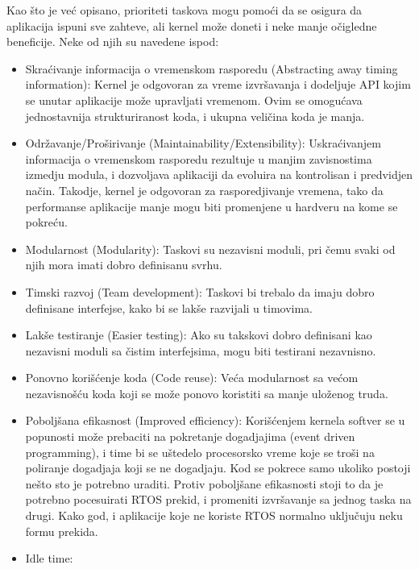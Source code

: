 \documentclass[a4paper,12pt, master]{etf}
\begin{document}
	Kao \v{s}to je ve\'{c} opisano, prioriteti taskova mogu pomo\'{c}i da se
	osigura da aplikacija ispuni sve zahteve, ali kernel mo\v{z}e doneti i neke
	manje o\v{c}igledne beneficije. Neke od njih su	navedene ispod:

	\begin{itemize}
		\item Skra\'{c}ivanje informacija o vremenskom rasporedu (Abstracting
		away timing information):
		Kernel je odgovoran za vreme izvr\v{s}avanja i dodeljuje API kojim se
		unutar aplikacije mo\v{z}e upravljati vremenom. Ovim se omogu\'{c}ava
		jednostavnija strukturiranost koda, i ukupna veli\v{c}ina koda je manja.
		\item Odr\v{z}avanje/Pro\v{s}irivanje (Maintainability/Extensibility):
		Uskra\'{c}ivanjem informacija o vremenskom rasporedu rezultuje u manjim
		zavisnostima izmedju modula, i dozvoljava aplikaciji da evoluira na
		kontrolisan i predvidjen na\v{c}in. Takodje, kernel je odgovoran za
		rasporedjivanje vremena, tako da performanse aplikacije manje mogu biti
		promenjene u hardveru na kome se pokre\'{c}u.
		\item Modularnost (Modularity):
		Taskovi su nezavisni moduli, pri \v{c}emu svaki od njih mora imati
		dobro definisanu svrhu.
		\item Timski razvoj (Team development):
		Taskovi bi trebalo da imaju dobro definisane interfejse, kako bi se
		lak\v{s}e razvijali u timovima.
		\item Lak\v{s}e testiranje (Easier testing):
		Ako su takskovi dobro definisani kao nezavisni moduli sa \v{c}istim
		interfejsima, mogu biti	testirani nezavnisno.
		\item Ponovno kori\v{s}\'{c}enje koda (Code reuse):
		Ve\'{c}a modularnost sa ve\'{c}om nezavisno\v{s}\'{c}u koda koji se
		mo\v{z}e ponovo koristiti sa manje ulo\v{z}enog truda.
		\item Pobolj\v{s}ana efikasnost (Improved efficiency):
		Kori\v{s}\'{c}enjem kernela softver se u popunosti mo\v{z}e prebaciti
		na pokretanje dogadjajima (event driven programming), i time bi se
		u\v{s}tedelo procesorsko vreme koje se tro\v{s}i na	poliranje dogadjaja
		koji se ne dogadjaju. Kod se pokrece samo ukoliko postoji ne\v{s}to
		sto je potrebno	uraditi. Protiv pobolj\v{s}ane efikasnosti stoji to da
		je potrebno pocesuirati	RTOS prekid, i promeniti izvr\v{s}avanje sa
		jednog taska na drugi. Kako god, i aplikacije koje ne koriste RTOS
		normalno uklju\v{c}uju neku formu prekida.
		\item Idle time:

\end{itemize}
\end{document}
